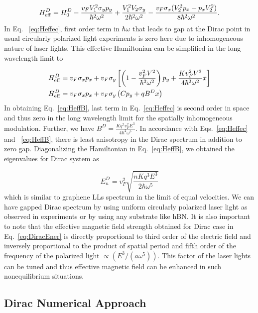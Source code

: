 \begin{equation} \label{eq:Heffec}
	H_{\rm eff}^D=H_{0}^D-\frac{v_F V_{1}^{2}\sigma_{y}p_{y}}{\hbar^{2}\omega^{2}}
	+\frac{V_{1}^{2}V_{2}\sigma_{y}}{2\hbar^{2}\omega^{2}}-\frac{v_F\sigma
		_{x}(V_{2}^{2}p_{x}+p_{x}V_{2}^{2})}{8\hbar^{2}\omega^{2}}.
\end{equation}
In Eq. ~\eqref{eq:Heffec}, first order term in $\hbar \omega$ that leads to gap at the Dirac point in usual circularly polarized light experiments \cite{YHW, JWM} is zero here due to inhomogeneous nature of laser lights.
This effective Hamiltonian can be simplified in the long wavelength limit to

\begin{align} \label{eq:HeffB}
  H_{\rm eff}^D &= v_F \sigma_x p_x + v_F \sigma_y \left[ \left( 1- \dfrac{v_F^2V^2}{\hbar^2\omega^2} \right) p_y + \dfrac{K v_F^2 V^3}{4 \hbar^2 \omega^2} x \right] \nonumber \\
  H_{\rm eff}^D &= v_{F}\sigma_{x}p_{x}+v_F\sigma_{y} \left( C p_{y} + qB^Dx \right)
\end{align}%
In obtaining Eq.~\eqref{eq:HeffB}, last term in Eq.~\eqref{eq:Heffec} is second order in space and thus zero in the long wavelength limit for the spatially inhomogeneous modulation.
Further, we have $B^D=\frac{Kq^2v_F^2 E^3}{4\hbar^{2}\omega^{5}}$.
In accordance with Eqs.~\eqref{eq:Heffec} and ~\eqref{eq:HeffB}, there is least anisotropy in the Dirac spectrum in addition to zero gap.
Diagonalizing the Hamiltonian in Eq.~\eqref{eq:HeffB}, we obtained the eigenvalues for Dirac system as%

\begin{equation} \label{eq:DiracEner}
  E_{n}^D = v_F^2 \sqrt{\dfrac{nK q^3 E^3}{2 \hbar \omega^5}}
\end{equation}
which is similar to graphene LLs spectrum in the limit of equal velocities.
We can have gapped Dirac spectrum by using uniform circularly polarized laser light as observed in experiments \cite{YHW, JWM} or by using any substrate like hBN.
It is also important to note that the effective magnetic field strength obtained for Dirac case in Eq.~\eqref{eq:DiracEner} is directly proportional to third order of the electric field and inversely proportional to the product of spatial period and fifth order of the frequency of the polarized light $\propto (E^3/(a\omega^5))$.
This factor of the laser lights can be tuned and thus effective magnetic field can be enhanced in such nonequilibrium situations.

\subsection{Dirac Numerical Approach}

